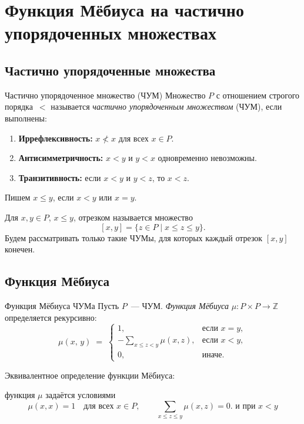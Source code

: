 
\section{Функция Мёбиуса на частично упорядоченных множествах}

\subsection{Частично упорядоченные множества}

\begin{Definition}{Частично упорядоченное множество (ЧУМ)}{}
	Множество $P$ с отношением строгого порядка~$<$ называется
	\emph{частично упорядоченным множеством} (ЧУМ), если выполнены:
	\begin{enumerate}
		\item \textbf{Иррефлексивность:} $x \not< x$ для всех $x \in P$.
		\item \textbf{Антисимметричность:} $x < y$ и $y < x$ одновременно невозможны.
		\item \textbf{Транзитивность:} если $x < y$ и $y < z$, то $x < z$.
	\end{enumerate}
	Пишем $x \leq y$, если $x < y$ или $x = y$.
	
	Для $x,y \in P$, $x \le y$, отрезком называется множество
	\[
	[x,y] = \{z \in P \mid x \le z \le y\}.
	\]
	Будем рассматривать только такие ЧУМы, для которых каждый отрезок $[x,y]$ конечен.
\end{Definition}

\subsection{Функция Мёбиуса}

\begin{Definition}{Функция Мёбиуса ЧУМа}{}
	Пусть $P$~--- ЧУМ. \emph{Функция Мёбиуса} $\mu \colon P \times P \to \mathbb{Z}$
	определяется рекурсивно:
	\[
	\mu(x,\, y)
	\;=\;
	\begin{cases}
		1,
		& \text{если } x = y,\\[6pt]
		-\displaystyle\sum_{x \leq z < y}\mu(x,z),
		& \text{если } x < y,\\[6pt]
		0,
		& \text{иначе.}
	\end{cases}
	\]
\end{Definition}

\begin{Corollary}{}{}
	Эквивалентное определение функции Мёбиуса:
	
	функция $\mu$ задаётся условиями
	\[
	\mu(x,x)=1 \quad \text{для всех } x \in P, \qquad \sum_{x \leq z \leq y} \mu(x,z)=0. \text{ и при }  x<y
	\]
\end{Corollary}

